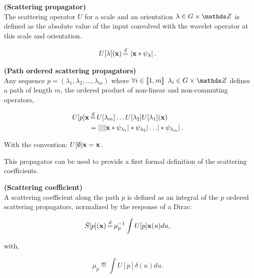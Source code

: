 \documentclass[a4paper,11pt]{report}
\begin{document}
      \begin{defn} \textbf{(Scattering propagator)}\\ 
				The scattering operator $U$ for a scale and an orientation $\lambda \in G \times \dsZ$ is defined as the absolute value of the input convolved with the wavelet operator at this scale and orientation.
				
				\begin{equation}
					\label{eq:scattering propagator}
					U[\lambda](\bfx) \eqdef \abs{\bfx \ast \psi_{\lambda}}.
				\end{equation}
				\label{def:SO}
			\end{defn}
						
			\begin{defn} \textbf{(Path ordered scattering propagators)}\\ 
				Any sequence $p = (\lambda_{1}, \lambda_{2},\dots ,\lambda_{m})$ where $\forall i \in \llbracket 1,m \rrbracket \;\; \lambda_{i} \in G \times \dsZ$ defines a path of length $m$, \ie the ordered product of non-linear and non-commuting operators,
				
				\begin{equation}
					\label{eq:path ordered SP}
					\begin{split}
						U[p]\bfx &\eqdef U[\lambda_{m}]\dots U[\lambda_{2}]U[\lambda_{1}](\bfx) \\
							&= \abs{\abs{\abs{\abs{\bfx \ast \psi_{\lambda_{1}}} \ast \psi_{\lambda_{2}}} 
							\dots } \ast \psi_{\lambda_{m}}}.   
					\end{split}
				\end{equation}
				
				With the convention: $U[\emptyset]{\bf x} = {\bf x}$.\\
				\label{def:path ordered SO}
      \end{defn} 
      
      This propagator can be used to provide a first formal definition of the scattering coefficients.
      
      \begin{defn} \textbf{(Scattering coefficient)}\\
				A scattering coefficient along the path $p$ is defined as an integral of the $p$ ordered scattering propagators, normalized by the response of a Dirac:

				\begin{equation}
					\label{eq:ST1}
					\bar{S}[p](\bfx) \eqdef \mu_{p}^{-1} \int U[p]\bfx(u) du,
				\end{equation}
				
				with,
				
				\begin{equation*}
					\label{eq:ST normalization}
					\mu_{p} \eqdef \int U[p]\delta(u)du.      
				\end{equation*}
				\label{def:SC}
      \end{defn}
      
\end{document}
